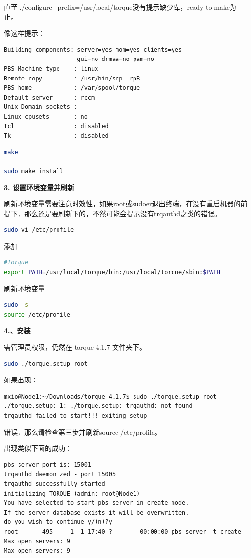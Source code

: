 {直至 ./configure --prefix=/usr/local/torque没有提示缺少库，ready to make为止。

像这样提示：
\begin{verbatim}
Building components: server=yes mom=yes clients=yes
                     gui=no drmaa=no pam=no
PBS Machine type    : linux
Remote copy         : /usr/bin/scp -rpB
PBS home            : /var/spool/torque
Default server      : rccm
Unix Domain sockets :
Linux cpusets       : no
Tcl                 : disabled
Tk                  : disabled
\end{verbatim}

\begin{lstlisting}[language=sh]
make

sudo make install
\end{lstlisting}

\textbf{3. 设置环境变量并刷新}

刷新环境变量需要注意时效性，如果root或sudoer退出终端，在没有重启机器的前提下，那么还是要刷新下的，不然可能会提示没有trqauthd之类的错误。
\begin{lstlisting}[language=sh]
sudo vi /etc/profile
\end{lstlisting}
添加
\begin{lstlisting}[language=sh]
#Torque
export PATH=/usr/local/torque/bin:/usr/local/torque/sbin:$PATH
\end{lstlisting}
刷新环境变量
\begin{lstlisting}[language=sh]
sudo -s
source /etc/profile
\end{lstlisting}

\textbf{4.、安装}

需管理员权限，仍然在 torque-4.1.7 文件夹下。
\begin{lstlisting}[language=sh]
sudo ./torque.setup root
\end{lstlisting}
如果出现：
\begin{verbatim}
mxio@Node1:~/Downloads/torque-4.1.7$ sudo ./torque.setup root
./torque.setup: 1: ./torque.setup: trqauthd: not found
trqauthd failed to start!!! exiting setup 
\end{verbatim}
错误，那么请检查第三步并刷新source /etc/profile。

出现类似下面的成功：
\begin{verbatim}
pbs_server port is: 15001
trqauthd daemonized - port 15005
trqauthd successfully started
initializing TORQUE (admin: root@Node1)
You have selected to start pbs_server in create mode.
If the server database exists it will be overwritten.
do you wish to continue y/(n)?y
root       495     1  1 17:40 ?        00:00:00 pbs_server -t create
Max open servers: 9
Max open servers: 9
\end{verbatim}


}
